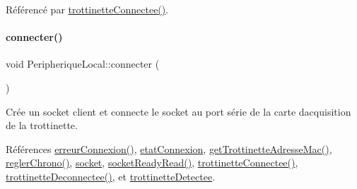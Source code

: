 Référencé par \hyperlink{class_peripherique_local_ad6e76380e6c9f48c36a10ac4af2c3d96}{trottinette\+Connectee()}.

\mbox{\label{class_peripherique_local_af2e7f023f8ed72ebc1d36e66c440ceca}} 
\paragraph{\texorpdfstring{connecter()}{connecter()}}
{\footnotesize\ttfamily void Peripherique\+Local\+::connecter (\begin{DoxyParamCaption}{ }\end{DoxyParamCaption})}

Crée un socket client et connecte le socket au port série de la carte d\textquotesingle{}acquisition de la trottinette. 

Références \hyperlink{class_peripherique_local_abb86db4a2a3d72a5de32253aa9af1ce8}{erreur\+Connexion()}, \hyperlink{class_peripherique_local_a5359e5a94b32b8a90c06ec999de13d2c}{etat\+Connexion}, \hyperlink{class_peripherique_local_a465658a204541e309f2647d473f658d8}{get\+Trottinette\+Adresse\+Mac()}, \hyperlink{class_peripherique_local_ae4f8521445a9dc3a51ff116e1f6597d7}{regler\+Chrono()}, \hyperlink{class_peripherique_local_a0058bf8367b4b8f907838b83a9150c07}{socket}, \hyperlink{class_peripherique_local_a48840475209b5cabcf60e3176de63b92}{socket\+Ready\+Read()}, \hyperlink{class_peripherique_local_ad6e76380e6c9f48c36a10ac4af2c3d96}{trottinette\+Connectee()}, \hyperlink{class_peripherique_local_ab081485bf0f9403d9e7fc5f0407cdc5c}{trottinette\+Deconnectee()}, et \hyperlink{class_peripherique_local_af6f664b6af67f1c90eb017391ac812ed}{trottinette\+Detectee}.


